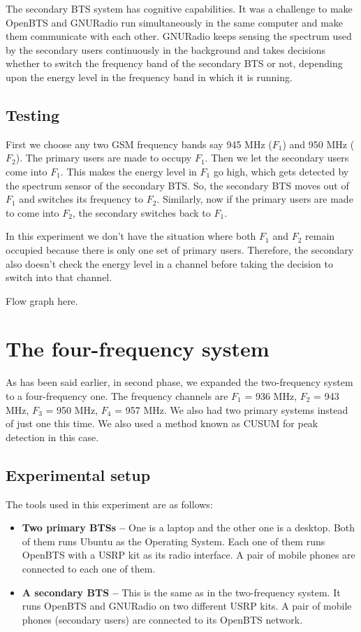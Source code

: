 The secondary BTS system has cognitive capabilities. It was a challenge to 
make OpenBTS and GNURadio run simultaneously in the same computer and make 
them communicate with each other. GNURadio keeps sensing the spectrum used by
the secondary users continuously in the background and takes decisions whether
to switch the frequency band of the secondary BTS or not, depending upon the 
energy level in the frequency band in which it is running.

\subsection{Testing}
First we choose any two GSM frequency bands say 945 MHz ($F_1$) and 950 MHz 
($F_2$). The primary users are made to occupy $F_1$. Then we let the secondary
users come into $F_1$. This makes the energy level in $F_1$ go high, which 
gets detected by the spectrum sensor of the secondary BTS. So, the secondary 
BTS moves out of $F_1$ and switches its frequency to $F_2$. Similarly, now if 
the primary users are made to come into $F_2$, the secondary switches back to 
$F_1$.

In this experiment we don't have the situation where both $F_1$ and $F_2$ 
remain occupied because there is only one set of primary users. Therefore, the 
secondary also doesn't check the energy level in a channel before taking the
decision to switch into that channel.

Flow graph here.


\section{The four-frequency system}

As has been said earlier, in second phase, we expanded the two-frequency
system to a four-frequency one. The frequency channels are $F_1$ = 936 MHz, 
$F_2$ = 943 MHz, $F_3$ = 950 MHz, $F_4$ = 957 MHz. We also had two primary 
systems instead of just one this time. We also used a method known as CUSUM 
for peak detection in this case.
\subsection{Experimental setup}
The tools used in this experiment are as follows:
\begin{itemize}
    \item \textbf{Two primary BTSs --} One is a laptop and the other one is a
    desktop. Both of them runs Ubuntu as the Operating System. Each one of
    them runs OpenBTS with a USRP kit as its radio interface. A pair of mobile
    phones are connected to each one of them.
    \item \textbf{A secondary BTS --} This is the same as in the 
    two-frequency system. It runs OpenBTS and GNURadio on two different USRP
    kits. A pair of mobile phones (secondary users) are connected to its
    OpenBTS network.
\end{itemize}

